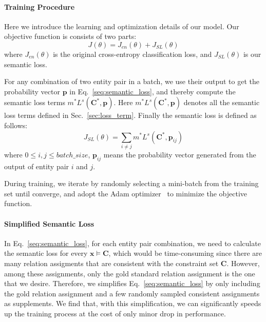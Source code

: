 \paragraph{Training Procedure}
Here we introduce the learning and optimization details of our model. Our objective function is consists of two parts:
\begin{equation}
	J(\theta) = J_{en}(\theta) + J_{SL}(\theta)
\end{equation}
where  $J_{en}(\theta)$ is the original cross-entropy classification loss, and $J_{SL}(\theta)$ is our semantic loss.


For any combination of two entity pair in a batch, we use their \APCNN output to get the probability vector $\bm{p}$ in Eq.~\ref{seq:semantic_loss},
and thereby compute the semantic loss terms $m^{*}L^{s}(\bm{C}^{*}, \bm{p})$.
Here $m^{*}L^{s}(\bm{C}^{*}, \bm{p})$ denotes all the semantic loss terms defined in Sec.~\ref{sec:loss_term}.
Finally the semantic loss is defined as follows:
\begin{equation}
	J_{SL}(\theta) = \sum\limits_{i \neq j}{m^{*}L^{s}(\bm{C}^{*}, \bm{p}_{ij})}
\end{equation}
where $0\leq i, j \leq batch\_size$, $\bm{p}_{ij} $ means the probability vector generated from the \APCNN output of entity pair $i$ and $j$.

During training, we iterate by randomly selecting a mini-batch from the training set until converge, and adopt the Adam optimizer~\cite{kingma2014adam} to minimize the objective function.
\paragraph{Simplified Semantic Loss}
In Eq.~\ref{seq:semantic_loss}, for each entity pair combination, we need to calculate the semantic loss for every $\bm x \models \bm{C}$, which would be time-consuming since there are many relation assigments that are consistent with the constraint set $\bm{C}$.
However, among these assignments, only the gold standard relation assignment is the one that we desire.
Therefore, we simplifies Eq.~\ref{seq:semantic_loss} by only including the gold relation assignment and a few randomly sampled consistent assignments as supplements.
We find that, with this simplification, we can significantly speeds up the training process at the cost of only minor drop in performance.


